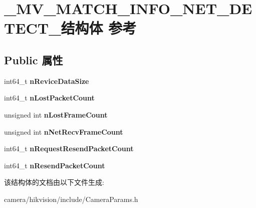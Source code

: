 \hypertarget{struct___m_v___m_a_t_c_h___i_n_f_o___n_e_t___d_e_t_e_c_t__}{}\section{\+\_\+\+M\+V\+\_\+\+M\+A\+T\+C\+H\+\_\+\+I\+N\+F\+O\+\_\+\+N\+E\+T\+\_\+\+D\+E\+T\+E\+C\+T\+\_\+结构体 参考}
\label{struct___m_v___m_a_t_c_h___i_n_f_o___n_e_t___d_e_t_e_c_t__}
\subsection*{Public 属性}
\begin{DoxyCompactItemize}
\item 
\mbox{\label{struct___m_v___m_a_t_c_h___i_n_f_o___n_e_t___d_e_t_e_c_t___ab028a86cc395bd06316612122d8e246a}} 
int64\+\_\+t {\bfseries n\+Revice\+Data\+Size}
\item 
\mbox{\label{struct___m_v___m_a_t_c_h___i_n_f_o___n_e_t___d_e_t_e_c_t___ab21a019f6d655eb484c4b8189f695763}} 
int64\+\_\+t {\bfseries n\+Lost\+Packet\+Count}
\item 
\mbox{\label{struct___m_v___m_a_t_c_h___i_n_f_o___n_e_t___d_e_t_e_c_t___a409b30370b973ca35240b95441429554}} 
unsigned int {\bfseries n\+Lost\+Frame\+Count}
\item 
\mbox{\label{struct___m_v___m_a_t_c_h___i_n_f_o___n_e_t___d_e_t_e_c_t___a88a3dfa4e4c08cf3f1f4c256c656b3ee}} 
unsigned int {\bfseries n\+Net\+Recv\+Frame\+Count}
\item 
\mbox{\label{struct___m_v___m_a_t_c_h___i_n_f_o___n_e_t___d_e_t_e_c_t___a62ef285e224910e41b8b2adf7afd4b65}} 
int64\+\_\+t {\bfseries n\+Request\+Resend\+Packet\+Count}
\item 
\mbox{\label{struct___m_v___m_a_t_c_h___i_n_f_o___n_e_t___d_e_t_e_c_t___a0e7f6be5e7e10ed84ee2c8443e61b795}} 
int64\+\_\+t {\bfseries n\+Resend\+Packet\+Count}
\end{DoxyCompactItemize}


该结构体的文档由以下文件生成\+:\begin{DoxyCompactItemize}
\item 
camera/hikvision/include/Camera\+Params.\+h\end{DoxyCompactItemize}
